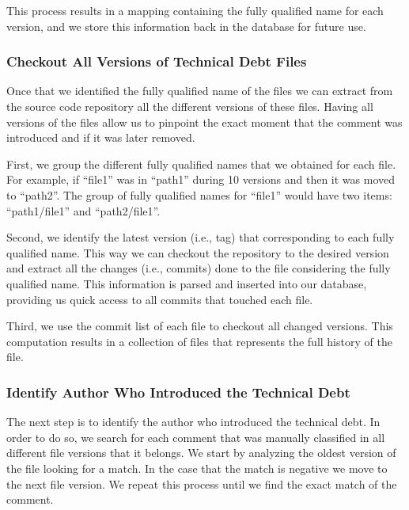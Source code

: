 This process results in a mapping containing the fully qualified name for each version, and we store this information back in the database for future use.

\subsubsection*{Checkout All Versions of Technical Debt Files}
\label{subsub:checkout_all_versions_of_technical_debt_files}

Once that we identified the fully qualified name of the \SATD files we can extract from the source code repository all the different versions of these files. Having all versions of the \SATD files allow us to pinpoint the exact moment that the \SATD comment was introduced and if it was later removed.

First, we group the different fully qualified names that we obtained for each file. For example, if ``file1'' was in ``path1'' during 10 versions and then it was moved to ``path2''. The group of fully qualified names for ``file1'' would have two items: ``path1/file1'' and ``path2/file1''. 

Second, we identify the latest version (i.e., tag) that corresponding to each fully qualified name. This way we can checkout the repository to the desired version and extract all the changes (i.e., commits) done to the file considering the fully qualified name. This information is parsed and inserted into our database, providing us quick access to all commits that touched each \SATD file. 

Third, we use the commit list of each \SATD file to checkout all changed versions. This computation results in a collection of files that represents the full history of the \SATD file.  

\subsubsection*{Identify Author Who Introduced the Technical Debt}
\label{subsub:identify_author_who_introduced_the_technical_debt}

The next step is to identify the author who introduced the technical debt. In order to do so, we search for each \SATD comment that was manually classified in all different file versions that it belongs. We start by analyzing the oldest version of the \SATD file looking for a match. In the case that the match is negative we move to the next \SATD file version. We repeat this process until we find the exact match of the \SATD comment. 

